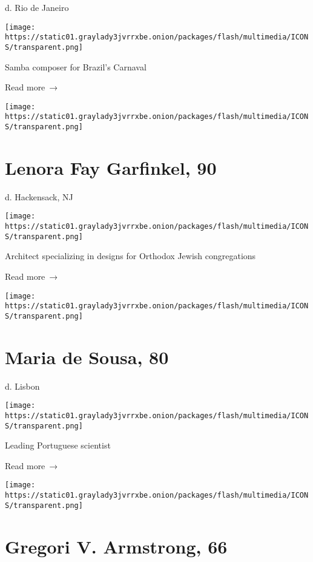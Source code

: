 d. Rio de Janeiro

\texttt{[image: https://static01.graylady3jvrrxbe.onion/packages/flash/multimedia/ICONS/transparent.png]}

Samba composer for Brazil's Carnaval

 Read more~→

\href{https://www.nytimes3xbfgragh.onion/2020/07/03/obituaries/lenora-garfinkel-dead-coronavirus.html}{}

\texttt{[image: https://static01.graylady3jvrrxbe.onion/packages/flash/multimedia/ICONS/transparent.png]}

\hypertarget{lenora-fay-garfinkel-90}{%
\section{Lenora Fay Garfinkel, 90}\label{lenora-fay-garfinkel-90}}

d. Hackensack, NJ

\texttt{[image: https://static01.graylady3jvrrxbe.onion/packages/flash/multimedia/ICONS/transparent.png]}

Architect specializing in designs for Orthodox Jewish congregations

 Read more~→

\href{https://www.nytimes3xbfgragh.onion/2020/07/02/obituaries/maria-de-sousa-dead-coronavirus.html}{}

\texttt{[image: https://static01.graylady3jvrrxbe.onion/packages/flash/multimedia/ICONS/transparent.png]}

\hypertarget{maria-de-sousa-80}{%
\section{Maria de Sousa, 80}\label{maria-de-sousa-80}}

d. Lisbon

\texttt{[image: https://static01.graylady3jvrrxbe.onion/packages/flash/multimedia/ICONS/transparent.png]}

Leading Portuguese scientist

 Read more~→

\href{https://www.nytimes3xbfgragh.onion/2020/07/02/us/gregori-armstrong-dead-coronavirus.html}{}

\texttt{[image: https://static01.graylady3jvrrxbe.onion/packages/flash/multimedia/ICONS/transparent.png]}

\hypertarget{gregori-v-armstrong-66}{%
\section{Gregori V. Armstrong, 66}\label{gregori-v-armstrong-66}}

